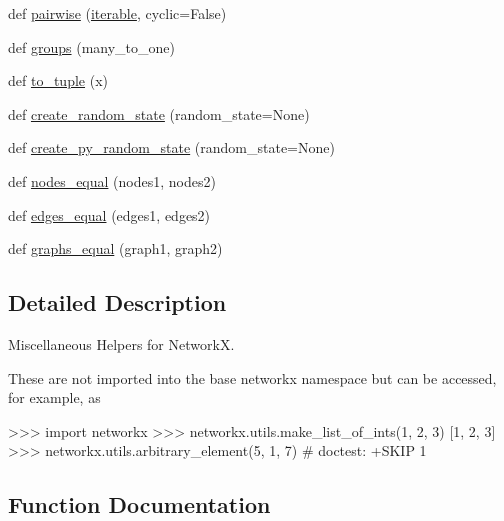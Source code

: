 \begin{DoxyCompactItemize}
\item 
def \hyperlink{namespacenetworkx_1_1utils_1_1misc_a3a5a039422a593c49554f67d5ed353ac}{pairwise} (\hyperlink{namespacenetworkx_1_1utils_1_1misc_ae65f2c291dc1744406702c19798e65ec}{iterable}, cyclic=False)
\item 
def \hyperlink{namespacenetworkx_1_1utils_1_1misc_a3fd4c57079b5d0aa69046f653c93306a}{groups} (many\+\_\+to\+\_\+one)
\item 
def \hyperlink{namespacenetworkx_1_1utils_1_1misc_aef864bf26463af0cf2e41b0797365789}{to\+\_\+tuple} (x)
\item 
def \hyperlink{namespacenetworkx_1_1utils_1_1misc_a8eddf1b3913ba2b4d6e1e8f1eab984f1}{create\+\_\+random\+\_\+state} (random\+\_\+state=None)
\item 
def \hyperlink{namespacenetworkx_1_1utils_1_1misc_ad8c08698fd77aa410765b5aea62f9b10}{create\+\_\+py\+\_\+random\+\_\+state} (random\+\_\+state=None)
\item 
def \hyperlink{namespacenetworkx_1_1utils_1_1misc_a11d6d25970c3c7b729c775aa8949ce9f}{nodes\+\_\+equal} (nodes1, nodes2)
\item 
def \hyperlink{namespacenetworkx_1_1utils_1_1misc_afddbff2eb97969114081e94d3efe88d0}{edges\+\_\+equal} (edges1, edges2)
\item 
def \hyperlink{namespacenetworkx_1_1utils_1_1misc_ade1b11ea29ea0e65b27196990e1aa73b}{graphs\+\_\+equal} (graph1, graph2)
\end{DoxyCompactItemize}


\subsection{Detailed Description}
\begin{DoxyVerb}Miscellaneous Helpers for NetworkX.

These are not imported into the base networkx namespace but
can be accessed, for example, as

>>> import networkx
>>> networkx.utils.make_list_of_ints({1, 2, 3})
[1, 2, 3]
>>> networkx.utils.arbitrary_element({5, 1, 7})  # doctest: +SKIP
1
\end{DoxyVerb}
 

\subsection{Function Documentation}
\mbox{\label{namespacenetworkx_1_1utils_1_1misc_aee73dcbb065355b5943f7f81cbda859b}} 

